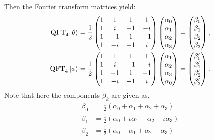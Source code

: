 \begin{example}
Then the Fourier transform matrices yield:
\begin{align*}
    \text{QFT}_4 \ket{\theta} &= \frac{1}{2}
    \begin{pmatrix}
        1 & 1 & 1 & 1 \\
        1 & i & -1 & -i \\
        1 & -1 & 1 & -1 \\
        1 & -i & -1 & i
    \end{pmatrix}
    \begin{pmatrix}
        \alpha_0 \\
        \alpha_1 \\
        \alpha_2 \\
        \alpha_3
    \end{pmatrix} =
    \begin{pmatrix}
        \beta_0 \\
        \beta_1 \\
        \beta_2 \\
        \beta_3
    \end{pmatrix}, \\
    \text{QFT}_4 \ket{\phi} &= \frac{1}{2}
    \begin{pmatrix}
        1 & 1 & 1 & 1 \\
        1 & i & -1 & -i \\
        1 & -1 & 1 & -1 \\
        1 & -i & -1 & i
    \end{pmatrix}
    \begin{pmatrix}
        \alpha_1 \\
        \alpha_2 \\
        \alpha_3 \\
        \alpha_0
    \end{pmatrix} =
    \begin{pmatrix}
        \beta_0' \\
        \beta_1' \\
        \beta_2' \\
        \beta_3'
    \end{pmatrix}.
\end{align*}
Note that here the components \(\beta_k\) are given as,
\begin{align*}
    \beta_0 &= \frac{1}{2}(\alpha_0+\alpha_1+\alpha_2+\alpha_3)\\
    \beta_1 &= \frac{1}{2}(\alpha_0+\iota\alpha_1-\alpha_2-\iota\alpha_3)\\
    \beta_2 &=\frac{1}{2}(\alpha_0-\alpha_1+\alpha_2-\alpha_3)\\

\end{align*}
\end{example}
